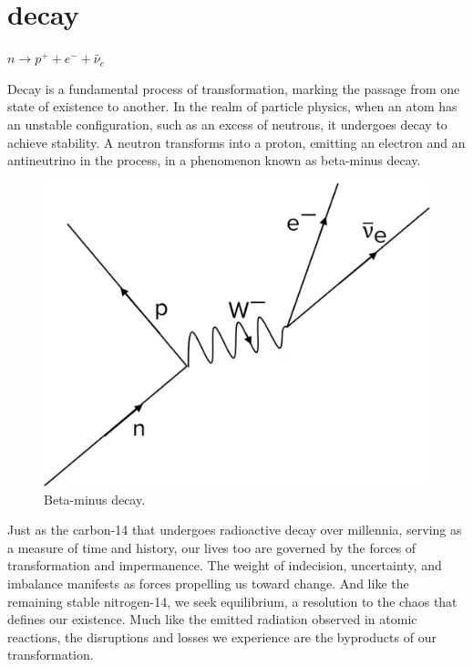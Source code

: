 \chapter*{decay}
\begin{center}
\vspace{2cm}
\begin{flushright}
\large
\textit{ $n \rightarrow p^+ + e^- + \bar{\nu}_e$ }
\end{flushright}
\vspace{2cm}
\end{center}
\normalsize

\newpage  %
Decay is a fundamental process of transformation, marking the passage from one state of existence to another. In the realm of particle physics, when an atom has an unstable configuration, such as an excess of neutrons, it undergoes decay to achieve stability. A neutron transforms into a proton, emitting an electron and an antineutrino in the process, in a phenomenon known as beta-minus decay.

\begin{figure}
    \centering
    \includegraphics[width=0.8\linewidth]{assets/betaminusdecay.png} 
    \caption{\small Beta-minus decay.}
    \label{fig:betaminusdecay}
\end{figure}

Just as the carbon-14 that undergoes radioactive decay over millennia, serving as a measure of time and history, our lives too are governed by the forces of transformation and impermanence. The weight of indecision, uncertainty, and imbalance manifests as forces propelling us toward change. And like the remaining stable nitrogen-14, we seek equilibrium, a resolution to the chaos that defines our existence. Much like the emitted radiation observed in atomic reactions, the disruptions and losses we experience are the byproducts of our transformation.

